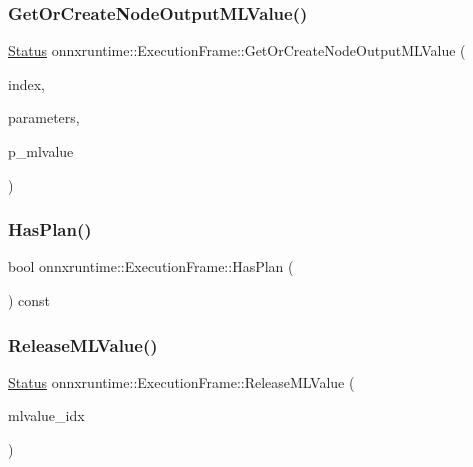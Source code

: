 \subsubsection{\texorpdfstring{Get\+Or\+Create\+Node\+Output\+M\+L\+Value()}{GetOrCreateNodeOutputMLValue()}}
{\footnotesize\ttfamily \mbox{\hyperlink{classonnxruntime_1_1common_1_1Status}{Status}} onnxruntime\+::\+Execution\+Frame\+::\+Get\+Or\+Create\+Node\+Output\+M\+L\+Value (\begin{DoxyParamCaption}\item[{int}]{index,  }\item[{const \mbox{\hyperlink{structonnxruntime_1_1MLValueAllocationParameters}{M\+L\+Value\+Allocation\+Parameters}} \&}]{parameters,  }\item[{\mbox{\hyperlink{classonnxruntime_1_1MLValue}{M\+L\+Value}} $\ast$\&}]{p\+\_\+mlvalue }\end{DoxyParamCaption})}

\mbox{\label{classonnxruntime_1_1ExecutionFrame_ad71f0d94ccc79c50cd0110f35fe90c4c}} 
\subsubsection{\texorpdfstring{Has\+Plan()}{HasPlan()}}
{\footnotesize\ttfamily bool onnxruntime\+::\+Execution\+Frame\+::\+Has\+Plan (\begin{DoxyParamCaption}{ }\end{DoxyParamCaption}) const\hspace{0.3cm}{\ttfamily [inline]}}

\mbox{\label{classonnxruntime_1_1ExecutionFrame_af1bc334c5b33e50593b5b4604724eac6}} 
\subsubsection{\texorpdfstring{Release\+M\+L\+Value()}{ReleaseMLValue()}}
{\footnotesize\ttfamily \mbox{\hyperlink{classonnxruntime_1_1common_1_1Status}{Status}} onnxruntime\+::\+Execution\+Frame\+::\+Release\+M\+L\+Value (\begin{DoxyParamCaption}\item[{int}]{mlvalue\+\_\+idx }\end{DoxyParamCaption})}

